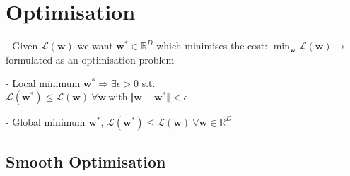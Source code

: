 \section*{Optimisation}

- Given $\mathcal{L}(\mathbf{w})$ we want $\mathbf{w^*} \in \mathbb{R}^D$ which minimises the cost: $\min_\mathbf{w} \mathcal{L}(\mathbf{w}) \rightarrow$ formulated as an optimisation problem

- Local minimum $\mathbf{w^*} \Rightarrow \exists \epsilon > 0$ s.t. \\
$\mathcal{L}(\mathbf{w^*}) \leq \mathcal{L}(\mathbf{w}) \ \forall \mathbf{w} \ \mathrm{with} \ \Vert \mathbf{w}-\mathbf{w^*} \Vert < \epsilon$

- Global minimum $\mathbf{w^*}$,
$\mathcal{L}(\mathbf{w^*}) \leq \mathcal{L}(\mathbf{w}) \ \forall \mathbf{w} \in \mathbb{R}^D$

\subsection*{Smooth Optimisation}